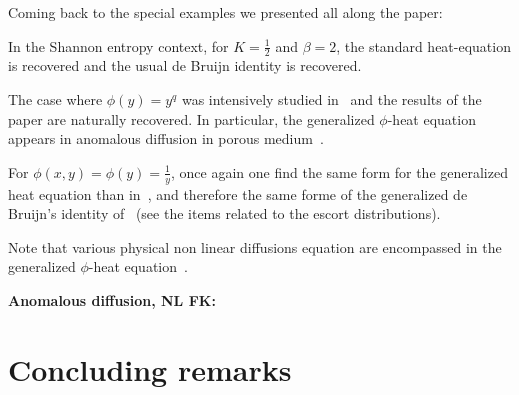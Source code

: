 \documentclass[entropy,article,submit,moreauthors,pdftex]{Definitions/mdpi}
\newcounter{GaussExample}%
\newcounter{qGaussExample}%
\newcounter{arcsineExample}%
\newcommand{\Avoir}[1]{{\color{red}\bf #1}}                                  %
\begin{document}
Coming back to the special examples we presented all along the paper:
%
\begin{Example}
  In  the Shannon  entropy context,  for  $K =  \frac12$  and $\beta  = 2$,  the
  standard  heat-equation is  recovered  and  the usual  de  Bruijn identity  is
  recovered.
\end{Example}
%
\begin{Example}
  The case where $\phi(y) =  y^q$ was intensively studied in~\cite{Ber13:08} and
  the  results  of  the  paper  are naturally  recovered.   In  particular,  the
  generalized  $\phi$-heat equation  appears  in anomalous  diffusion in  porous
  medium~\cite{TsaLen02, Ber13:08, Vaz06}.
\end{Example}
%
\begin{Example}
  For $\phi(x,y) = \phi(y) = \frac{1}{y}$, once again one find the same form for
  the generalized  heat equation  than in~\cite{TsaLen02, Ber13:08,  Vaz06}, and
  therefore   the  same   forme  of   the  generalized   de  Bruijn's   identity
  of~\cite{Ber13:08} (see the items related to the escort distributions).
\end{Example}

Note that various physical non linear diffusions equation are encompassed in the
generalized $\phi$-heat equation~\cite{GilKer04, Vaz06}.

\Avoir{Anomalous diffusion, NL FK: \cite{TsaLen02,}}




\section{Concluding remarks}
\label{sec:Conclusion}
\end{document}
